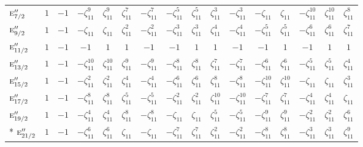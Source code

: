 \documentclass[10pt,a4paper]{article}
\numberwithin{equation}{section}
\newcommand{\irr}[1]{\text{\normalfont\scshape #1}}
\newcommand{\rootunity}[1]{\zeta_{#1}}
\begin{document}
{\begin{longtable}{@{}lccccccccccccccc@{}}
$\irr{e}_{7/2}''$ & $1$ & $-1$ & $-\rootunity{11}^{9}$ & $\rootunity{11}^{9}$ & $\rootunity{11}^{7}$ & $-\rootunity{11}^{7}$ & $-\rootunity{11}^{5}$ & $\rootunity{11}^{5}$ & $\rootunity{11}^{3}$ & $-\rootunity{11}^{3}$ & $-\rootunity{11}$ & $\rootunity{11}$ & $-\rootunity{11}^{10}$ & $\rootunity{11}^{10}$ & $\rootunity{11}^{8}$\\
$\irr{e}_{9/2}''$ & $1$ & $-1$ & $-\rootunity{11}$ & $\rootunity{11}$ & $\rootunity{11}^{2}$ & $-\rootunity{11}^{2}$ & $-\rootunity{11}^{3}$ & $\rootunity{11}^{3}$ & $\rootunity{11}^{4}$ & $-\rootunity{11}^{4}$ & $-\rootunity{11}^{5}$ & $\rootunity{11}^{5}$ & $-\rootunity{11}^{6}$ & $\rootunity{11}^{6}$ & $\rootunity{11}^{7}$\\
$\irr{e}_{11/2}''$ & $1$ & $-1$ & $-1$ & $1$ & $1$ & $-1$ & $-1$ & $1$ & $1$ & $-1$ & $-1$ & $1$ & $-1$ & $1$ & $1$\\
$\irr{e}_{13/2}''$ & $1$ & $-1$ & $-\rootunity{11}^{10}$ & $\rootunity{11}^{10}$ & $\rootunity{11}^{9}$ & $-\rootunity{11}^{9}$ & $-\rootunity{11}^{8}$ & $\rootunity{11}^{8}$ & $\rootunity{11}^{7}$ & $-\rootunity{11}^{7}$ & $-\rootunity{11}^{6}$ & $\rootunity{11}^{6}$ & $-\rootunity{11}^{5}$ & $\rootunity{11}^{5}$ & $\rootunity{11}^{4}$\\
$\irr{e}_{15/2}''$ & $1$ & $-1$ & $-\rootunity{11}^{2}$ & $\rootunity{11}^{2}$ & $\rootunity{11}^{4}$ & $-\rootunity{11}^{4}$ & $-\rootunity{11}^{6}$ & $\rootunity{11}^{6}$ & $\rootunity{11}^{8}$ & $-\rootunity{11}^{8}$ & $-\rootunity{11}^{10}$ & $\rootunity{11}^{10}$ & $-\rootunity{11}$ & $\rootunity{11}$ & $\rootunity{11}^{3}$\\
$\irr{e}_{17/2}''$ & $1$ & $-1$ & $-\rootunity{11}^{8}$ & $\rootunity{11}^{8}$ & $\rootunity{11}^{5}$ & $-\rootunity{11}^{5}$ & $-\rootunity{11}^{2}$ & $\rootunity{11}^{2}$ & $\rootunity{11}^{10}$ & $-\rootunity{11}^{10}$ & $-\rootunity{11}^{7}$ & $\rootunity{11}^{7}$ & $-\rootunity{11}^{4}$ & $\rootunity{11}^{4}$ & $\rootunity{11}$\\
$\irr{e}_{19/2}''$ & $1$ & $-1$ & $-\rootunity{11}^{4}$ & $\rootunity{11}^{4}$ & $\rootunity{11}^{8}$ & $-\rootunity{11}^{8}$ & $-\rootunity{11}$ & $\rootunity{11}$ & $\rootunity{11}^{5}$ & $-\rootunity{11}^{5}$ & $-\rootunity{11}^{9}$ & $\rootunity{11}^{9}$ & $-\rootunity{11}^{2}$ & $\rootunity{11}^{2}$ & $\rootunity{11}^{6}$\\*
$\irr{e}_{21/2}''$ & $1$ & $-1$ & $-\rootunity{11}^{6}$ & $\rootunity{11}^{6}$ & $\rootunity{11}$ & $-\rootunity{11}$ & $-\rootunity{11}^{7}$ & $\rootunity{11}^{7}$ & $\rootunity{11}^{2}$ & $-\rootunity{11}^{2}$ & $-\rootunity{11}^{8}$ & $\rootunity{11}^{8}$ & $-\rootunity{11}^{3}$ & $\rootunity{11}^{3}$ & $\rootunity{11}^{9}$\\
\bottomrule\end{longtable}}
\end{document}
